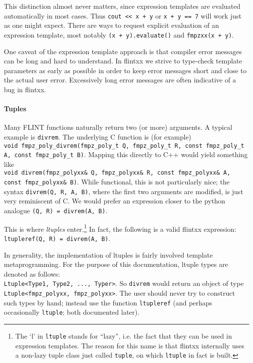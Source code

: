 \documentclass[a4paper,10pt]{book}
\newcommand{\code}{\lstinline}
\begin{document}
{{This distinction almost never matters, since expression templates are evaluated
automatically in most cases. Thus \code{cout << x + y} or \code{x + y == 7} will
work just as one might expect. There are ways to request explicit evaluation of
an expression template, most notably \code{(x + y).evaluate()} and
\code{fmpzxx(x + y)}.

One caveat of the expression template approach is that compiler error messages
can be long and hard to understand.
In flintxx we strive to type-check template parameters as early as possible in
order to keep error messages short and close to the actual user error.
Excessively long error messages are often indicative of a bug in flintxx.

\paragraph{Tuples}

Many FLINT functions naturally return two (or more) arguments. A typical example
is \code{divrem}. The underlying C function is (for example)\\
\code{void fmpz_poly_divrem(fmpz_poly_t Q, fmpz_poly_t R, const fmpz_poly_t A, const fmpz_poly_t B)}.
Mapping this directly to C++ would yield something like\\
\code{void divrem(fmpz_polyxx& Q, fmpz_polyxx& R, const fmpz_polyxx& A, const fmpz_polyxx& B)}.
While functional, this is not particularly nice; the syntax
\code{divrem(Q, R, A, B)}, where the first two arguments are modified, is just
very reminiscent of C. We would prefer an expression closer to the
python analogue \code{(Q, R) = divrem(A, B)}.

This is where \emph{ltuples} enter.\footnote{The `l' in \code{ltuple} stands for
``lazy'', i.e. the fact that they can be used in expression templates.
The reason for this name
is that flintxx internally uses a non-lazy tuple class just
called \code{tuple}, on which \code{ltuple} in fact is built.}
In fact, the following is a valid
flintxx expression:\\
\code{ltupleref(Q, R) = divrem(A, B)}.

In generality, the implementation of ltuples is fairly involved template
metaprogramming. For the purpose of this documentation, ltuple types are denoted
as follows:\\
\code{Ltuple<Type1, Type2, ..., Typer>}. So \code{divrem} would
return an object of type\\
\code{Ltuple<fmpz_polyxx, fmpz_polyxx>}. The user
should never try to construct such types by hand; instead use the function
\code{ltupleref} (and perhaps occasionally \code{ltuple}; both documented
later).

}}
\end{document}
